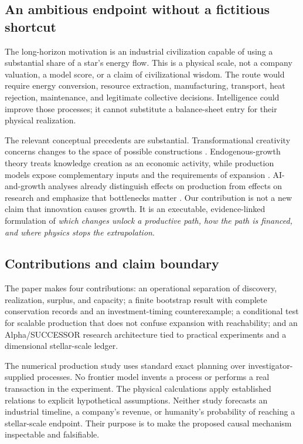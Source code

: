 \documentclass[11pt,letterpaper]{article}
\newcommand{\1}{\mathbf 1}
\theoremstyle{remark}\newtheorem{remark}{Remark}[section]
\begin{document}
\subsection{An ambitious endpoint without a fictitious shortcut}
The long-horizon motivation is an industrial civilization capable of using a substantial share of a star's energy flow. This is a physical scale, not a company valuation, a model score, or a claim of civilizational wisdom. The route would require energy conversion, resource extraction, manufacturing, transport, heat rejection, maintenance, and legitimate collective decisions. Intelligence could improve those processes; it cannot substitute a balance-sheet entry for their physical realization.

The relevant conceptual precedents are substantial. Transformational creativity concerns changes to the space of possible constructions \citep{boden,ritchie}. Endogenous-growth theory treats knowledge creation as an economic activity, while production models expose complementary inputs and the requirements of expansion \citep{romer,vonneumann}. AI-and-growth analyses already distinguish effects on production from effects on research and emphasize that bottlenecks matter \citep{aghion,acemoglu}. Our contribution is not a new claim that innovation causes growth. It is an executable, evidence-linked formulation of \emph{which changes unlock a productive path, how the path is financed, and where physics stops the extrapolation}.

\subsection{Contributions and claim boundary}
The paper makes four contributions: an operational separation of discovery, realization, surplus, and capacity; a finite bootstrap result with complete conservation records and an investment-timing counterexample; a conditional test for scalable production that does not confuse expansion with reachability; and an Alpha/SUCCESSOR research architecture tied to practical experiments and a dimensional stellar-scale ledger.

The numerical production study uses standard exact planning over investigator-supplied processes. No frontier model invents a process or performs a real transaction in the experiment. The physical calculations apply established relations to explicit hypothetical assumptions. Neither study forecasts an industrial timeline, a company's revenue, or humanity's probability of reaching a stellar-scale endpoint. Their purpose is to make the proposed causal mechanism inspectable and falsifiable.
\end{document}
